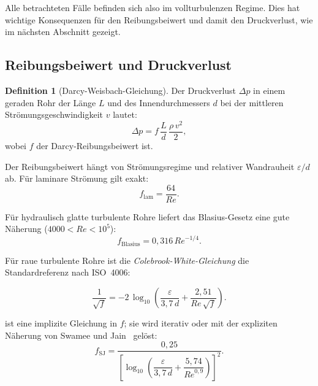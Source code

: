 ﻿\documentclass[12pt,a4paper,twoside]{article}
\theoremstyle{plain}
\theoremstyle{definition}
\newtheorem{definition}[theorem]{Definition}
\theoremstyle{remark}
\newcommand{\Rey}{\mathit{Re}}
\begin{document}
\noindent
Alle betrachteten Fälle befinden sich also im vollturbulenzen Regime.
Dies hat wichtige Konsequenzen für den Reibungsbeiwert und damit den
Druckverlust, wie im nächsten Abschnitt gezeigt.

\subsection{Reibungsbeiwert und Druckverlust}
\label{ssec:druckverlust}

\begin{definition}[Darcy-Weisbach-Gleichung]
Der Druckverlust $\Delta p$ in einem geraden Rohr der Länge $L$ und des
Innendurchmessers $d$ bei der mittleren Strömungsgeschwindigkeit $v$ lautet:
\begin{equation}
  \Delta p = f \, \frac{L}{d} \, \frac{\rho \, v^2}{2},
  \label{eq:darcy_weisbach}
\end{equation}
wobei $f$ der Darcy-Reibungsbeiwert ist.
\end{definition}

Der Reibungsbeiwert hängt von Strömungsregime und relativer Wandrauheit
$\varepsilon/d$ ab.
Für laminare Strömung gilt exakt:
\begin{equation}
  f_{\mathrm{lam}} = \frac{64}{\Rey}.
  \label{eq:f_laminar}
\end{equation}

Für hydraulisch glatte turbulente Rohre liefert das Blasius-Gesetz
eine gute Näherung ($4000 < \Rey < 10^5$):
\begin{equation}
  f_{\mathrm{Blasius}} = 0{,}316 \, \Rey^{-1/4}.
  \label{eq:f_blasius}
\end{equation}

Für raue turbulente Rohre ist die \emph{Colebrook-White-Gleichung} die
Standardreferenz nach ISO~4006:

\begin{equation}
  \frac{1}{\sqrt{f}} = -2\,\log_{10}\!\left(
      \frac{\varepsilon}{3{,}7\,d} + \frac{2{,}51}{\Rey\,\sqrt{f}}
  \right).
  \label{eq:colebrook}
\end{equation}

\noindent
{} ist eine implizite Gleichung in $f$; sie wird iterativ oder
mit der expliziten Näherung von Swamee und Jain~\cite{Swamee1976} gelöst:
\begin{equation}
  f_{\mathrm{SJ}} = \frac{0{,}25}{\left[
      \log_{10}\!\!\left(\dfrac{\varepsilon}{3{,}7\,d}
        + \dfrac{5{,}74}{\Rey^{0{,}9}}\right)
  \right]^2}.
  \label{eq:swamee_jain}
\end{equation}
\end{document}
